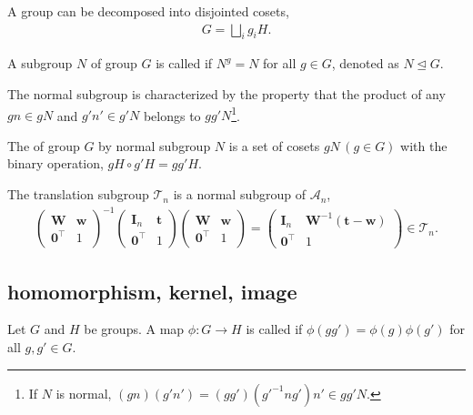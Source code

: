 A group can be decomposed into disjointed cosets,
\begin{align}
  G = \bigsqcup_{i} g_{i} H.
\end{align}

\begin{screen}
  \begin{defn}
    A subgroup $N$ of group $G$ is called  if $N^{g} = N$ for all $g \in G$, denoted as $N \trianglelefteq G$.
  \end{defn}
\end{screen}

The normal subgroup is characterized by the property that the product of any $gn \in gN$ and $g'n' \in g'N$ belongs to $gg'N$\footnote{
  If $N$ is normal, $(gn)(g'n') = (gg')(g'^{-1} n g') n' \in gg' N$.
}.

\begin{screen}
  \begin{defn}
    The  of group $G$ by normal subgroup $N$ is a set of cosets $gN \, (g \in G)$ with the binary operation, $gH \circ g'H = gg' H$.
  \end{defn}
\end{screen}

The translation subgroup $\mathcal{T}_{n}$ is a normal subgroup of $\mathcal{A}_{n}$,
\begin{align*}
  \begin{pmatrix} \bm{W} & \bm{w} \\ \bm{0}^{\top} & 1 \end{pmatrix}^{-1}
  \begin{pmatrix} \bm{I}_{n} & \bm{t} \\ \bm{0}^{\top} & 1 \end{pmatrix}
  \begin{pmatrix} \bm{W} & \bm{w} \\ \bm{0}^{\top} & 1 \end{pmatrix}
  =
  \begin{pmatrix} \bm{I}_{n} & \bm{W}^{-1} (\bm{t} - \bm{w}) \\ \bm{0}^{\top} & 1 \end{pmatrix}
  \in \mathcal{T}_{n}.
\end{align*}

\subsection{homomorphism, kernel, image}

\begin{screen}
  \begin{definition}[homomorphism]
    Let $G$ and $H$ be groups.
    A map $\phi: G \to H$ is called  if $\phi(gg') = \phi(g) \phi(g')$ for all $g, g' \in G$.
  \end{definition}
\end{screen}

